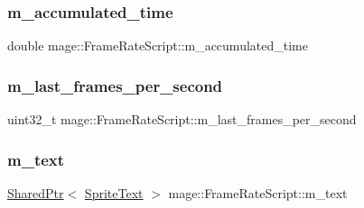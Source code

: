 \hypertarget{classmage_1_1_frame_rate_script_ad2811547f84f1c62392e36fd8b82042d}{}\label{classmage_1_1_frame_rate_script_ad2811547f84f1c62392e36fd8b82042d} 
\subsubsection{\texorpdfstring{m\+\_\+accumulated\+\_\+time}{m\_accumulated\_time}}
{\footnotesize\ttfamily double mage\+::\+Frame\+Rate\+Script\+::m\+\_\+accumulated\+\_\+time\hspace{0.3cm}{\ttfamily [private]}}

\hypertarget{classmage_1_1_frame_rate_script_a6126772a3b500a0c044837f432d10976}{}\label{classmage_1_1_frame_rate_script_a6126772a3b500a0c044837f432d10976} 
\subsubsection{\texorpdfstring{m\+\_\+last\+\_\+frames\+\_\+per\+\_\+second}{m\_last\_frames\_per\_second}}
{\footnotesize\ttfamily uint32\+\_\+t mage\+::\+Frame\+Rate\+Script\+::m\+\_\+last\+\_\+frames\+\_\+per\+\_\+second\hspace{0.3cm}{\ttfamily [private]}}

\hypertarget{classmage_1_1_frame_rate_script_a7d55db21f500e92914293cd6850e3b53}{}\label{classmage_1_1_frame_rate_script_a7d55db21f500e92914293cd6850e3b53} 
\subsubsection{\texorpdfstring{m\+\_\+text}{m\_text}}
{\footnotesize\ttfamily \hyperlink{namespacemage_a1e01ae66713838a7a67d30e44c67703e}{Shared\+Ptr}$<$ \hyperlink{classmage_1_1_sprite_text}{Sprite\+Text} $>$ mage\+::\+Frame\+Rate\+Script\+::m\+\_\+text\hspace{0.3cm}{\ttfamily [private]}}

